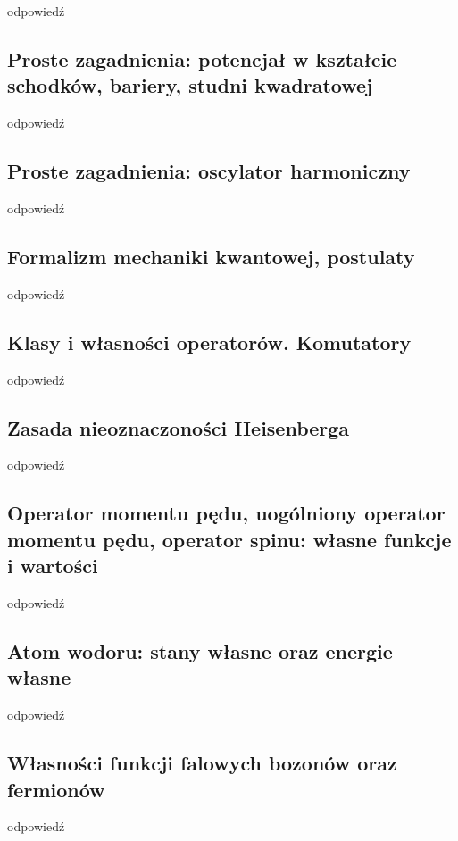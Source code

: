 odpowiedź

\subsection{Proste zagadnienia: potencjał w kształcie schodków, bariery, studni kwadratowej}

odpowiedź

\subsection{Proste zagadnienia: oscylator harmoniczny}

odpowiedź

\subsection{Formalizm mechaniki kwantowej, postulaty}

odpowiedź

\subsection{Klasy i własności operatorów. Komutatory}

odpowiedź

\subsection{Zasada nieoznaczoności Heisenberga}

odpowiedź

\subsection{Operator momentu pędu, uogólniony operator momentu pędu, operator spinu: własne funkcje i wartości}

odpowiedź

\subsection{Atom wodoru: stany własne oraz energie własne}

odpowiedź

\subsection{Własności funkcji falowych bozonów oraz fermionów}

odpowiedź
